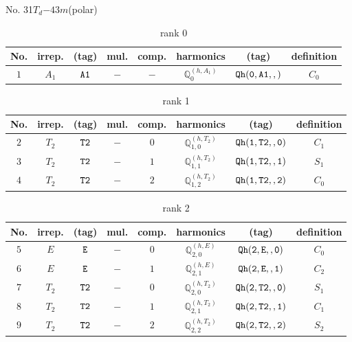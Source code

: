 \documentclass[fleqn,8pt]{jsarticle}
\begin{document}
\setcounter{MaxMatrixCols}{16}

\begin{center}
\LARGE
No. 31\quad$T_{d}$\quad$-43m$\quad[ cubic ] (polar)
\end{center}
\begin{table}[ht!]
\begin{center}
\caption{rank 0}
\renewcommand{\arraystretch}{1.3}
\begin{tabular}{cccccccc} \hline \hline
No. & irrep. & (tag) & mul. & comp. & harmonics & (tag) & definition \\ \hline
$ 1 $ & $ A_{1} $ & $ {\tt A1} $ & $ - $ & $ - $ & $ \mathbb{Q}_{0}^{(h,A_{1})} $ & $ {\tt Qh(0,A1,,)} $ & $ C_{0} $ \\
 \hline \hline
\end{tabular}
\end{center}
\end{table}
\begin{table}[ht!]
\begin{center}
\caption{rank 1}
\renewcommand{\arraystretch}{1.3}
\begin{tabular}{cccccccc} \hline \hline
No. & irrep. & (tag) & mul. & comp. & harmonics & (tag) & definition \\ \hline
$ 2 $ & $ T_{2} $ & $ {\tt T2} $ & $ - $ & $ 0 $ & $ \mathbb{Q}_{1,0}^{(h,T_{2})} $ & $ {\tt Qh(1,T2,,0)} $ & $ C_{1} $ \\
$ 3 $ & $ T_{2} $ & $ {\tt T2} $ & $ - $ & $ 1 $ & $ \mathbb{Q}_{1,1}^{(h,T_{2})} $ & $ {\tt Qh(1,T2,,1)} $ & $ S_{1} $ \\
$ 4 $ & $ T_{2} $ & $ {\tt T2} $ & $ - $ & $ 2 $ & $ \mathbb{Q}_{1,2}^{(h,T_{2})} $ & $ {\tt Qh(1,T2,,2)} $ & $ C_{0} $ \\
 \hline \hline
\end{tabular}
\end{center}
\end{table}
\begin{table}[ht!]
\begin{center}
\caption{rank 2}
\renewcommand{\arraystretch}{1.3}
\begin{tabular}{cccccccc} \hline \hline
No. & irrep. & (tag) & mul. & comp. & harmonics & (tag) & definition \\ \hline
$ 5 $ & $ E $ & $ {\tt E} $ & $ - $ & $ 0 $ & $ \mathbb{Q}_{2,0}^{(h,E)} $ & $ {\tt Qh(2,E,,0)} $ & $ C_{0} $ \\
$ 6 $ & $ E $ & $ {\tt E} $ & $ - $ & $ 1 $ & $ \mathbb{Q}_{2,1}^{(h,E)} $ & $ {\tt Qh(2,E,,1)} $ & $ C_{2} $ \\
$ 7 $ & $ T_{2} $ & $ {\tt T2} $ & $ - $ & $ 0 $ & $ \mathbb{Q}_{2,0}^{(h,T_{2})} $ & $ {\tt Qh(2,T2,,0)} $ & $ S_{1} $ \\
$ 8 $ & $ T_{2} $ & $ {\tt T2} $ & $ - $ & $ 1 $ & $ \mathbb{Q}_{2,1}^{(h,T_{2})} $ & $ {\tt Qh(2,T2,,1)} $ & $ C_{1} $ \\
$ 9 $ & $ T_{2} $ & $ {\tt T2} $ & $ - $ & $ 2 $ & $ \mathbb{Q}_{2,2}^{(h,T_{2})} $ & $ {\tt Qh(2,T2,,2)} $ & $ S_{2} $ \\
 \hline \hline
\end{tabular}
\end{center}
\end{table}
\end{document}
